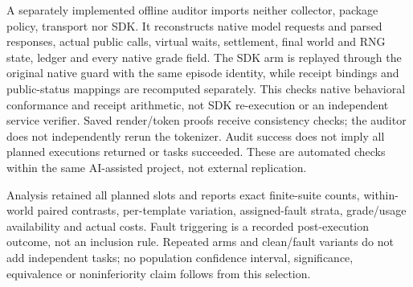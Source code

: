 A separately implemented offline auditor imports neither collector, package
policy, transport nor SDK. It reconstructs native model requests and parsed
responses, actual public calls, virtual waits, settlement, final world and RNG
state, ledger and every native grade field. The SDK arm is replayed through the
original native guard with the same episode identity, while receipt bindings
and public-status mappings are recomputed separately. This checks native
behavioral conformance and receipt arithmetic, not SDK re-execution or an
independent service verifier. Saved render/token proofs receive consistency
checks; the auditor does not independently rerun the tokenizer. Audit success
does not imply all planned executions returned or tasks succeeded. These are
automated checks within the same AI-assisted project, not external replication.

Analysis retained all planned slots and reports exact finite-suite counts,
within-world paired contrasts, per-template variation, assigned-fault strata,
grade/usage availability and actual costs. Fault triggering is a recorded
post-execution outcome, not an inclusion rule. Repeated arms and clean/fault
variants do not add independent tasks; no population confidence interval,
significance, equivalence or noninferiority claim follows from this selection.
